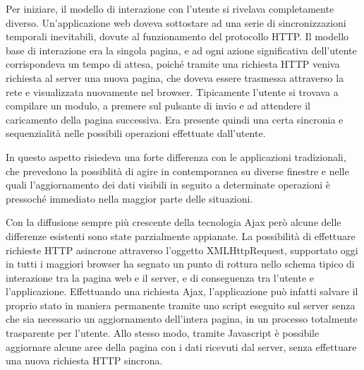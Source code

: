 Per iniziare, il modello di interazione con l'utente si rivelava completamente diverso. Un'applicazione web doveva sottostare ad una serie di sincronizzazioni temporali inevitabili, dovute al funzionamento del protocollo HTTP. Il modello base di interazione era la singola pagina, e ad ogni azione significativa dell'utente corrispondeva un tempo di attesa, poiché tramite una richiesta HTTP veniva richiesta al server una nuova pagina, che doveva essere trasmessa attraverso la rete e visualizzata nuovamente nel browser. Tipicamente l'utente si trovava a compilare un modulo, a premere sul pulsante di invio e ad attendere il caricamento della pagina successiva. Era presente quindi una certa sincronia e sequenzialità nelle possibili operazioni effettuate dall'utente. 

In questo aspetto risiedeva una forte differenza con le applicazioni tradizionali, che prevedono la possiblità di agire in contemporanea su diverse finestre e nelle quali l'aggiornamento dei dati visibili in seguito a determinate operazioni è pressoché immediato nella maggior parte delle situazioni.

Con la diffusione sempre più crescente della tecnologia Ajax però alcune delle differenze esistenti sono state parzialmente appianate. La possibilità di effettuare richieste HTTP asincrone attraverso l'oggetto XMLHttpRequest, supportato oggi in tutti i maggiori browser ha segnato un punto di rottura nello schema tipico di interazione tra la pagina web e il server, e di conseguenza tra l'utente e l'applicazione. Effettuando una richiesta Ajax, l'applicazione può infatti salvare il proprio stato in maniera permanente tramite uno script eseguito sul server senza che sia necessario un aggiornamento dell'intera pagina, in un processo totalmente trasparente per l'utente. Allo stesso modo, tramite Javascript è possibile aggiornare alcune aree della pagina con i dati ricevuti dal server, senza effettuare una nuova richiesta HTTP sincrona.

